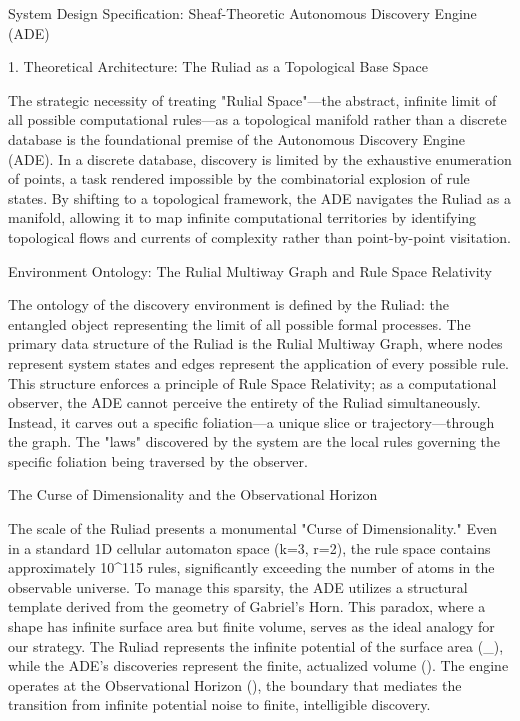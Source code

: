 System Design Specification: Sheaf-Theoretic Autonomous Discovery Engine (ADE)

1. Theoretical Architecture: The Ruliad as a Topological Base Space

The strategic necessity of treating "Rulial Space"—the abstract, infinite limit of all possible computational rules—as a topological manifold rather than a discrete database is the foundational premise of the Autonomous Discovery Engine (ADE). In a discrete database, discovery is limited by the exhaustive enumeration of points, a task rendered impossible by the combinatorial explosion of rule states. By shifting to a topological framework, the ADE navigates the Ruliad as a manifold, allowing it to map infinite computational territories by identifying topological flows and currents of complexity rather than point-by-point visitation.

Environment Ontology: The Rulial Multiway Graph and Rule Space Relativity

The ontology of the discovery environment is defined by the Ruliad: the entangled object representing the limit of all possible formal processes. The primary data structure of the Ruliad is the Rulial Multiway Graph, where nodes represent system states and edges represent the application of every possible rule. This structure enforces a principle of Rule Space Relativity; as a computational observer, the ADE cannot perceive the entirety of the Ruliad simultaneously. Instead, it carves out a specific foliation—a unique slice or trajectory—through the graph. The "laws" discovered by the system are the local rules governing the specific foliation being traversed by the observer.

The Curse of Dimensionality and the Observational Horizon

The scale of the Ruliad presents a monumental "Curse of Dimensionality." Even in a standard 1D cellular automaton space (k=3, r=2), the rule space contains approximately 10^{115} rules, significantly exceeding the number of atoms in the observable universe. To manage this sparsity, the ADE utilizes a structural template derived from the geometry of Gabriel’s Horn. This paradox, where a shape has infinite surface area but finite volume, serves as the ideal analogy for our strategy. The Ruliad represents the infinite potential of the surface area (_\infty), while the ADE's discoveries represent the finite, actualized volume (). The engine operates at the Observational Horizon (\partial), the boundary that mediates the transition from infinite potential noise to finite, intelligible discovery.

